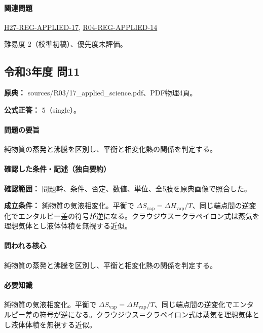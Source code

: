 \paragraph{関連問題} \hyperref[q:h27-reg-applied-17]{H27-REG-APPLIED-17}, \hyperref[q:r04-reg-applied-14]{R04-REG-APPLIED-14}

\par 難易度 2（校準初稿）、優先度未評価。

\subsection{令和3年度 問11}
\label{q:r03-reg-applied-11}

\noindent\textbf{原典：} sources/R03/17\_applied\_science.pdf、PDF物理4頁。

\textbf{公式正答：} 5（single）。

\paragraph{問題の要旨} 純物質の蒸発と沸騰を区別し、平衡と相変化熱の関係を判定する。

\paragraph{確認した条件・記述（独自要約）}\mbox{}\par

\noindent\textbf{確認範囲：} 問題幹、条件、否定、数値、単位、全5肢を原典画像で照合した。\par

\noindent\textbf{成立条件：} 純物質の気液相変化。平衡で \(\Delta S_{\mathrm{vap}}=\Delta H_{\mathrm{vap}}/T\)、同じ端点間の逆変化でエンタルピー差の符号が逆になる。クラウジウス＝クラペイロン式は蒸気を理想気体とし液体体積を無視する近似。\par

\paragraph{問われる核心} 純物質の蒸発と沸騰を区別し、平衡と相変化熱の関係を判定する。

\paragraph{必要知識} 純物質の気液相変化。平衡で \(\Delta S_{\mathrm{vap}}=\Delta H_{\mathrm{vap}}/T\)、同じ端点間の逆変化でエンタルピー差の符号が逆になる。クラウジウス＝クラペイロン式は蒸気を理想気体とし液体体積を無視する近似。

